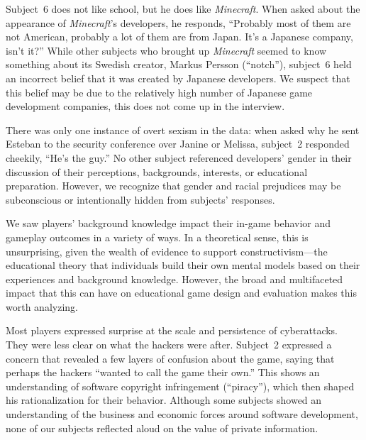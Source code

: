 \documentclass[letterpaper]{article}
\begin{document}
Subject~6 does not like school, but he does
like \textit{Minecraft}. When asked about the appearance of \textit{Minecraft}'s
developers, he responds, ``Probably most of them are not American,
probably a lot of them are from Japan. It's a Japanese company, isn't it?''
While other subjects who brought up \textit{Minecraft} seemed to know something
about its Swedish creator, Markus Persson (``notch''), subject~6 held
an incorrect belief that it was created by Japanese developers. 
We suspect that this belief may be due to the relatively high number
of Japanese game development companies, this does not come up in the interview.

There was only one instance of overt sexism in the data:
when asked why he sent Esteban to the security conference over
Janine or Melissa, subject~2 responded cheekily, ``He's the guy.''
No other subject referenced developers' gender in their discussion
of their perceptions, backgrounds, interests, or educational preparation.
However, we recognize that gender and racial prejudices may be
subconscious or intentionally hidden from subjects' responses.




We saw players' background knowledge impact their in-game behavior
and gameplay outcomes in a variety of ways.
In a theoretical sense, this is unsurprising, given the wealth of
evidence to support constructivism---the educational theory that
individuals build their own mental models based on their experiences
and background knowledge.
However, the broad and multifaceted impact that this can have on
educational game design and evaluation makes this worth analyzing.

Most players expressed surprise at the scale and persistence
of cyberattacks. They were less clear on what the hackers
were after. Subject~2 expressed a concern that revealed a few
layers of confusion about the game, saying that perhaps the
hackers ``wanted to call the game their own.''
This shows an understanding of software copyright infringement (``piracy''),
which then shaped his rationalization for their behavior.
Although some subjects showed an understanding of the business and
economic forces around software development, none of our subjects
reflected aloud on the value of private information.
\end{document}

